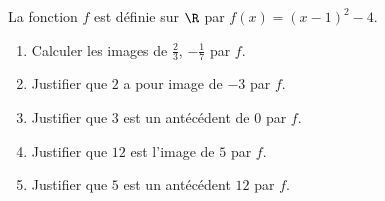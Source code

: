 
La fonction $f$ est définie sur $\R$ par $f(x)=(x-1)^2-4$.
\begin{enumerate}
\item Calculer les images de $\frac{2}{3}$, $-\frac{1}{7}$ par $f$.
\item Justifier que $2$ a pour image de $-3$ par $f$.
\item Justifier que $3$ est un antécédent de 0 par $f$.
\item Justifier que $12$ est l'image de $5$ par $f$.
\item Justifier que $5$ est un antécédent $12$ par $f$.
\end{enumerate}